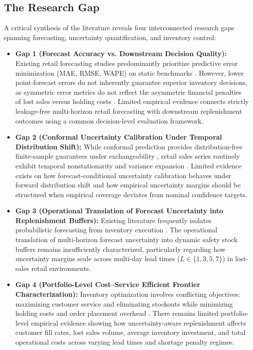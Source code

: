 \documentclass[11pt,a4paper]{article}
\begin{document}
\subsection{The Research Gap}
\label{sec:intro_gap}
A critical synthesis of the literature reveals four interconnected research gaps spanning forecasting, uncertainty quantification, and inventory control:
\begin{itemize}
    \item \textbf{Gap 1 (Forecast Accuracy vs. Downstream Decision Quality):} Existing retail forecasting studies predominantly prioritize predictive error minimization (MAE, RMSE, WAPE) on static benchmarks \cite{makridakis2022m5, hobor2026comparative}. However, lower point-forecast errors do not inherently guarantee superior inventory decisions, as symmetric error metrics do not reflect the asymmetric financial penalties of lost sales versus holding costs \cite{ban2019big, bertsimas2020predictive}. Limited empirical evidence connects strictly leakage-free multi-horizon retail forecasting with downstream replenishment outcomes using a common decision-level evaluation framework.
    \item \textbf{Gap 2 (Conformal Uncertainty Calibration Under Temporal Distribution Shift):} While conformal prediction provides distribution-free finite-sample guarantees under exchangeability \cite{vovk2005algorithmic, angelopoulos2021gentle}, retail sales series routinely exhibit temporal nonstationarity and variance expansion \cite{barber2023conformal}. Limited evidence exists on how forecast-conditional uncertainty calibration behaves under forward distribution shift and how empirical uncertainty margins should be structured when empirical coverage deviates from nominal confidence targets.
    \item \textbf{Gap 3 (Operational Translation of Forecast Uncertainty into Replenishment Buffers):} Existing literature frequently isolates probabilistic forecasting from inventory execution \cite{stankeviciute2021conformal, huber2019integrating}. The operational translation of multi-horizon forecast uncertainty into dynamic safety stock buffers remains insufficiently characterized, particularly regarding how uncertainty margins scale across multi-day lead times ($L \in \{1, 3, 5, 7\}$) in lost-sales retail environments.
    \item \textbf{Gap 4 (Portfolio-Level Cost--Service Efficient Frontier Characterization):} Inventory optimization involves conflicting objectives: maximizing customer service and eliminating stockouts while minimizing holding costs and order placement overhead \cite{silver1998inventory, snyder2019fundamentals}. There remains limited portfolio-level empirical evidence showing how uncertainty-aware replenishment affects customer fill rates, lost sales volume, average inventory investment, and total operational costs across varying lead times and shortage penalty regimes.
\end{itemize}
\end{document}
